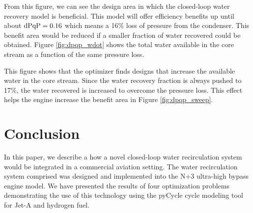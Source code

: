 \documentclass[conf]{new-aiaa}
\begin{document}

From this figure, we can see the design area in which the closed-loop water recovery model is beneficial.
This model will offer efficiency benefits up until about $\rm{dPqP} = 0.16$ which means a 16\% loss of pressure from the condenser.
This benefit area would be reduced if a smaller fraction of water recovered could be obtained.
Figure \ref{fig:dpqp_wdot} shows the total water available in the core stream as a function of the same pressure loss.


This figure shows that the optimizer finds designs that increase the available water in the core stream.
Since the water recovery fraction is always pushed to 17\%, the water recovered is increased to overcome the pressure loss.
This effect helps the engine increase the benefit area in Figure \ref{fig:dpqp_sweep}.


\section{Conclusion}
\label{sec:conc}
In this paper, we describe a how a novel closed-loop water recirculation system would be integrated in a commercial aviation setting.
The water recirculation system comprised was designed and implemented into the N+3 ultra-high bypass engine model.
We have presented the results of four optimization problems demonstrating the use of this technology using the pyCycle cycle modeling tool for Jet-A and hydrogen fuel.
\end{document}
